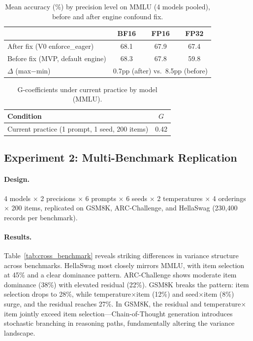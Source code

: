 \documentclass[11pt]{article}
\newcommand{\gcoeff}{G}
\begin{document}
\begin{table}[t]
\centering
\caption{Mean accuracy (\%) by precision level on MMLU (4 models pooled), before and after engine confound fix.}
\label{tab:precision_accuracy}
\begin{tabular}{lccc}
\toprule
& \textbf{BF16} & \textbf{FP16} & \textbf{FP32} \\
\midrule
After fix (V0 enforce\_eager) & 68.1 & 67.9 & 67.4 \\
Before fix (MVP, default engine) & 68.3 & 67.8 & 59.8 \\
\midrule
$\Delta$ (max$-$min) & \multicolumn{3}{c}{0.7pp (after) vs.\ 8.5pp (before)} \\
\bottomrule
\end{tabular}
\end{table}

\begin{table}[t]
\centering
\caption{G-coefficients under current practice by model (MMLU).}
\label{tab:mmlu_gcoeff}
\begin{tabular}{lc}
\toprule
\textbf{Condition} & $\gcoeff$ \\
\midrule
Current practice (1 prompt, 1 seed, 200 items) & 0.42 \\
\bottomrule
\end{tabular}
\end{table}

\subsection{Experiment 2: Multi-Benchmark Replication}
\label{sec:exp2}

\paragraph{Design.}
4 models $\times$ 2 precisions $\times$ 6 prompts $\times$ 6 seeds $\times$ 2 temperatures $\times$ 4 orderings $\times$ 200 items, replicated on GSM8K, ARC-Challenge, and HellaSwag (230,400 records per benchmark).

\paragraph{Results.}
Table~\ref{tab:cross_benchmark} reveals striking differences in variance structure across benchmarks.
HellaSwag most closely mirrors MMLU, with item selection at 45\% and a clear dominance pattern.
ARC-Challenge shows moderate item dominance (38\%) with elevated residual (22\%).
GSM8K breaks the pattern: item selection drops to 28\%, while temperature$\times$item (12\%) and seed$\times$item (8\%) surge, and the residual reaches 27\%.
In GSM8K, the residual and temperature$\times$item jointly exceed item selection---Chain-of-Thought generation introduces stochastic branching in reasoning paths, fundamentally altering the variance landscape.
\end{document}
